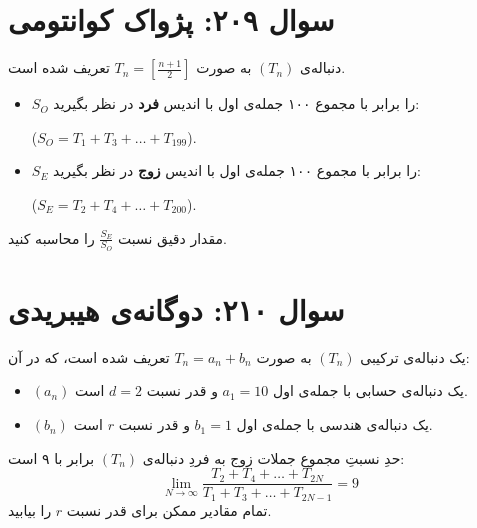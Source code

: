 \documentclass[12pt]{article}
\begin{document}
\section*{سوال ۲۰۹: پژواک کوانتومی}
دنباله‌ی $(T_n)$ به صورت $T_n = \left[\frac{n+1}{2}\right]$ تعریف شده است.
\begin{itemize}[rightmargin=2cm]
	\item $S_O$ را برابر با مجموع ۱۰۰ جمله‌ی اول با اندیس \textbf{فرد} در نظر بگیرید:
	
	\vspace{0.1cm}
	 ($S_O = T_1 + T_3 + \dots + T_{199}$).
	\item $S_E$ را برابر با مجموع ۱۰۰ جمله‌ی اول با اندیس \textbf{زوج} در نظر بگیرید:
	
	\vspace{0.2cm}
	 ($S_E = T_2 + T_4 + \dots + T_{200}$).
\end{itemize}

مقدار دقیق نسبت $\frac{S_E}{S_O}$ را محاسبه کنید.

\vspace{1cm}
\hrulefill
\vspace{1cm}


\section*{سوال ۲۱۰: دوگانه‌ی هیبریدی}
یک دنباله‌ی ترکیبی $(T_n)$ به صورت $T_n = a_n + b_n$ تعریف شده است، که در آن:
\begin{itemize}[rightmargin=2cm]
	\item $(a_n)$ یک دنباله‌ی حسابی با جمله‌ی اول $a_1=10$ و قدر نسبت $d=2$ است.
	\item $(b_n)$ یک دنباله‌ی هندسی با جمله‌ی اول $b_1=1$ و قدر نسبت $r$ است.
\end{itemize}
\vspace{0.5cm}

حدِ نسبتِ مجموع جملات زوج به فردِ دنباله‌ی $(T_n)$ برابر با ۹ است:
\[ \lim_{N \to \infty} \frac{T_2 + T_4 + \dots + T_{2N}}{T_1 + T_3 + \dots + T_{2N-1}} = 9 \]
\vspace{0.5cm}
تمام مقادیر ممکن برای قدر نسبت $r$ را بیابید.

\vspace{1cm}
\hrulefill
\vspace{1cm}
\end{document}
